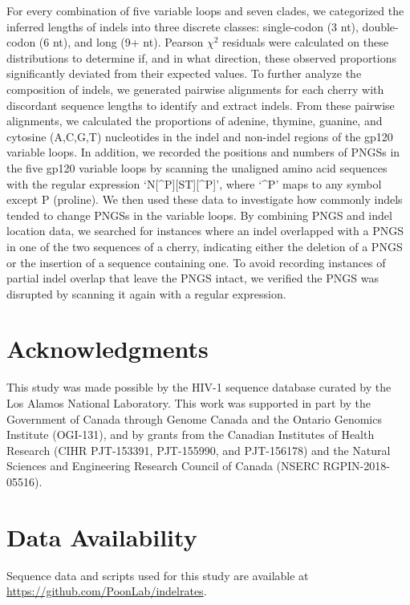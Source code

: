 \documentclass[12pt]{article}
\newcommand{\todo}[2]{\hl{\textbf{#1:} #2}}
\begin{document}
For every combination of five variable loops and seven clades, we categorized the inferred lengths of indels into three discrete classes: single-codon (3 nt), double-codon (6 nt), and long (9+ nt).
Pearson $\chi^2$ residuals were calculated on these distributions to determine if, and in what direction, these observed proportions significantly deviated from their expected values. 
To further analyze the composition of indels, we generated pairwise alignments for each cherry with discordant sequence lengths to identify and extract indels.   
From these pairwise alignments, we calculated the proportions of adenine, thymine, guanine, and cytosine (A,C,G,T) nucleotides in the indel and non-indel regions of the gp120 variable loops.
In addition, we recorded the positions and numbers of PNGSs in the five gp120 variable loops by scanning the unaligned amino acid sequences with the regular expression `N[\^{}P][ST][\^{}P]', where `\^{}P' maps to any symbol except P (proline). 
We then used these data to investigate how commonly indels tended to change PNGSs in the variable loops.   
By combining PNGS and indel location data, we searched for instances where an indel overlapped with a PNGS in one of the two sequences of a cherry, indicating either the deletion of a PNGS or the insertion of a sequence containing one.
To avoid recording instances of partial indel overlap that leave the PNGS intact, we verified the PNGS was disrupted by scanning it again with a regular expression. 


\section * {Acknowledgments}
This study was made possible by the HIV-1 sequence database curated by the Los Alamos National Laboratory. 
This work was supported in part by the Government of Canada through Genome Canada and the Ontario Genomics Institute (OGI-131), and by grants from the Canadian Institutes of Health Research (CIHR PJT-153391, PJT-155990, and PJT-156178) and the Natural Sciences and Engineering Research Council of Canada (NSERC RGPIN-2018-05516).

\section * {Data Availability}
Sequence data and scripts used for this study are available at \url{https://github.com/PoonLab/indelrates}. 

\clearpage


\end{document}
